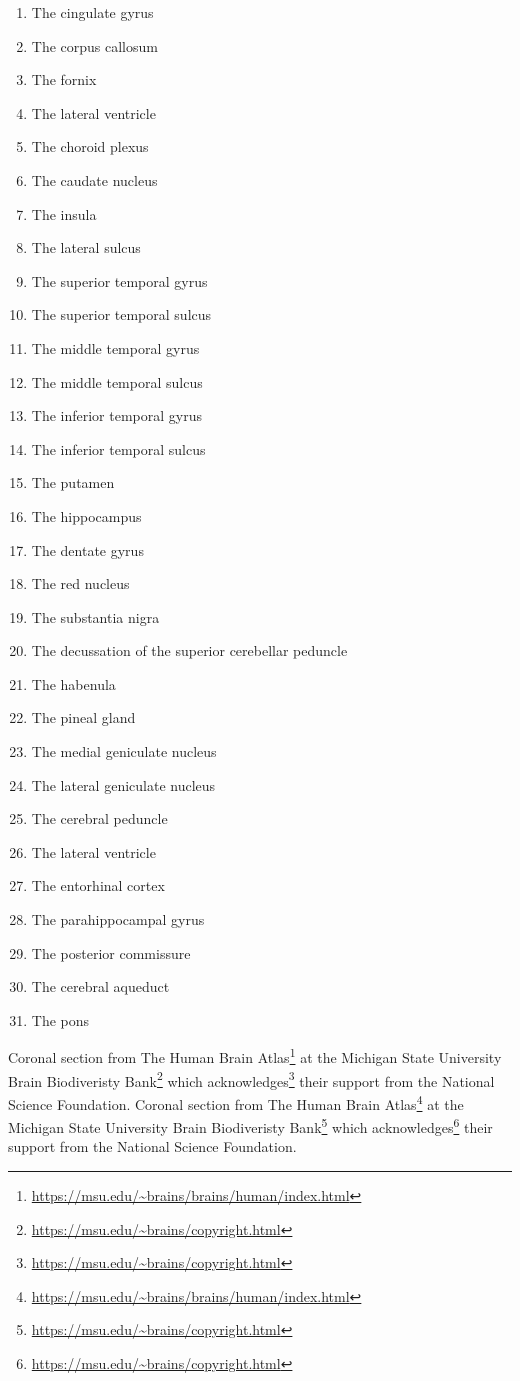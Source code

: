 \documentclass[]{book}
\providecommand{\tightlist}{%
  \setlength{\itemsep}{0pt}\setlength{\parskip}{0pt}}
\let\rmarkdownfootnote\footnote%
\def\footnote{\protect\rmarkdownfootnote}
\renewcommand{\href}[2]{#2\footnote{\url{#1}}}
\begin{document}
\begin{enumerate}
\def\labelenumi{\arabic{enumi}.}
\tightlist
\item
  The cingulate gyrus
\item
  The corpus callosum
\item
  The fornix
\item
  The lateral ventricle
\item
  The choroid plexus
\item
  The caudate nucleus
\item
  The insula
\item
  The lateral sulcus
\item
  The superior temporal gyrus
\item
  The superior temporal sulcus
\item
  The middle temporal gyrus
\item
  The middle temporal sulcus
\item
  The inferior temporal gyrus
\item
  The inferior temporal sulcus
\item
  The putamen
\item
  The hippocampus
\item
  The dentate gyrus
\item
  The red nucleus
\item
  The substantia nigra
\item
  The decussation of the superior cerebellar peduncle
\item
  The habenula
\item
  The pineal gland
\item
  The medial geniculate nucleus
\item
  The lateral geniculate nucleus
\item
  The cerebral peduncle
\item
  The lateral ventricle
\item
  The entorhinal cortex
\item
  The parahippocampal gyrus
\item
  The posterior commissure
\item
  The cerebral aqueduct
\item
  The pons
\end{enumerate}

Coronal section from \href{https://msu.edu/~brains/brains/human/index.html}{The Human Brain Atlas} at the \href{https://msu.edu/~brains/copyright.html}{Michigan State University Brain Biodiveristy Bank} which \href{https://msu.edu/~brains/copyright.html}{acknowledges} their support from the National Science Foundation. Coronal section from \href{https://msu.edu/~brains/brains/human/index.html}{The Human Brain Atlas} at the \href{https://msu.edu/~brains/copyright.html}{Michigan State University Brain Biodiveristy Bank} which \href{https://msu.edu/~brains/copyright.html}{acknowledges} their support from the National Science Foundation.
\end{document}
